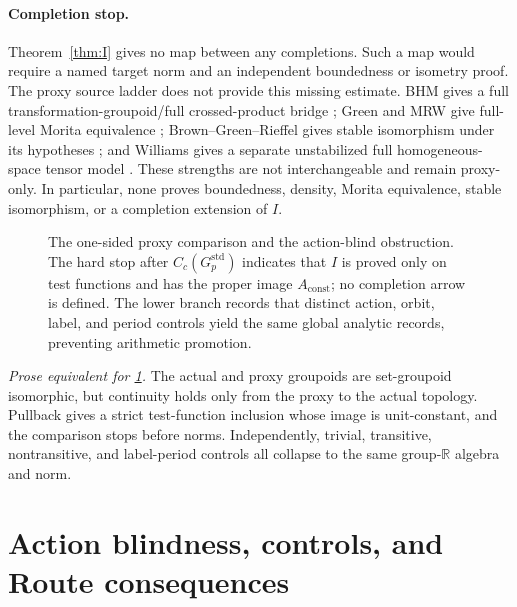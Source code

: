 \documentclass[11pt]{article}
\theoremstyle{definition}
\newcommand{\R}{\mathbb R}
\newcommand{\Gstd}{G_p^{\mathrm{std}}}
\newcommand{\Aconst}{A_{\mathrm{const}}}
\begin{document}
\paragraph{Completion stop.}
Theorem~\ref{thm:I} gives no map between any completions.  Such a map would
require a named target norm and an independent boundedness or isometry proof.
The proxy source ladder does not provide this missing estimate.  BHM gives a
full transformation-groupoid/full crossed-product bridge
\cite[Theorem~7.1]{BussHolkarMeyer2018}; Green and MRW give full-level Morita
equivalence \cite[Proposition~3, physical p.~13 / printed p.~203]{Green1978}
\cite[Theorem~2.8, physical p.~8 / printed p.~10]{MuhlyRenaultWilliams1987}; Brown--Green--Rieffel
gives stable isomorphism under its hypotheses
\cite[Theorem~1.2, physical p.~4 / printed p.~351]{BrownGreenRieffel1977};
and Williams gives a separate unstabilized full homogeneous-space tensor
model \cite[Eq.~(4.63) and Theorem~4.30]{Williams2007}.  These strengths are
not interchangeable and remain proxy-only.  In particular, none proves
boundedness, density, Morita equivalence, stable isomorphism, or a completion
extension of $I$.

\begin{figure}[htbp]
\centering
\resizebox{0.99\textwidth}{!}{}
\caption{The one-sided proxy comparison and the action-blind obstruction.
The hard stop after $C_c(\Gstd)$ indicates that $I$ is proved only on test
functions and has the proper image $\Aconst$; no completion arrow is defined.
The lower branch records that distinct action, orbit, label, and period
controls yield the same global analytic records, preventing arithmetic
promotion.}
\label{fig:proxy-action-blind}
\end{figure}

\noindent\textit{Prose equivalent for \cref{fig:proxy-action-blind}.}
The actual and proxy groupoids are set-groupoid isomorphic, but continuity
holds only from the proxy to the actual topology.  Pullback gives a strict
test-function inclusion whose image is unit-constant, and the comparison
stops before norms.  Independently, trivial, transitive, nontransitive, and
label-period controls all collapse to the same group-$\R$ algebra and norm.

\section{Action blindness, controls, and Route consequences}
\label{sec:controls-route}
\end{document}
